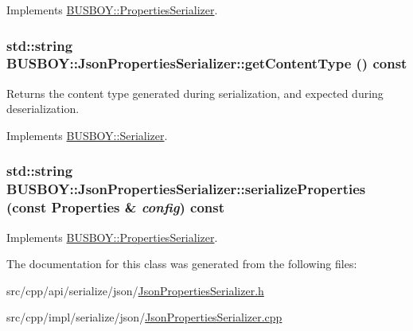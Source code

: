 Implements \hyperlink{classBUSBOY_1_1PropertiesSerializer_a5568739fc11feeea662fe06ab39194d8}{BUSBOY::PropertiesSerializer}.\hypertarget{classBUSBOY_1_1JsonPropertiesSerializer_ae05a9840dc947cb95e541e58b1af32ac}{
\subsubsection[{getContentType}]{\setlength{\rightskip}{0pt plus 5cm}std::string BUSBOY::JsonPropertiesSerializer::getContentType () const}}
\label{classBUSBOY_1_1JsonPropertiesSerializer_ae05a9840dc947cb95e541e58b1af32ac}


Returns the content type generated during serialization, and expected during deserialization. 

Implements \hyperlink{classBUSBOY_1_1Serializer_aadfd0df50149a0c59424b5910c5ae3ef}{BUSBOY::Serializer}.\hypertarget{classBUSBOY_1_1JsonPropertiesSerializer_ac0ff156d10457163c883e668011da97e}{
\subsubsection[{serializeProperties}]{\setlength{\rightskip}{0pt plus 5cm}std::string BUSBOY::JsonPropertiesSerializer::serializeProperties (const {\bf Properties} \& {\em config}) const}}
\label{classBUSBOY_1_1JsonPropertiesSerializer_ac0ff156d10457163c883e668011da97e}


Implements \hyperlink{classBUSBOY_1_1PropertiesSerializer_abd6db2e7700d60b30f3ff51daff343d9}{BUSBOY::PropertiesSerializer}.

The documentation for this class was generated from the following files:\begin{DoxyCompactItemize}
\item 
src/cpp/api/serialize/json/\hyperlink{JsonPropertiesSerializer_8h}{JsonPropertiesSerializer.h}\item 
src/cpp/impl/serialize/json/\hyperlink{JsonPropertiesSerializer_8cpp}{JsonPropertiesSerializer.cpp}\end{DoxyCompactItemize}
